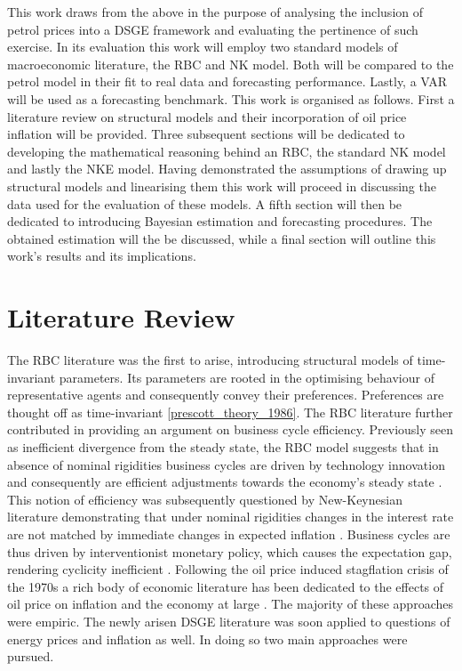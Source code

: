 \documentclass[12pt,a4paper,english]{article} %
\let\oldsection\section
\renewcommand\section{\clearpage\oldsection}
\begin{document}
	 This work draws from the above in the purpose of analysing the inclusion of petrol prices into a DSGE framework and evaluating the pertinence of such exercise. In its evaluation this work will employ two standard models of macroeconomic literature, the RBC and NK model. Both will be compared to the petrol model in their fit to real data and forecasting performance. Lastly, a \ac{VAR} will be used as a forecasting benchmark. This work is organised as follows. First a literature review on structural models and their incorporation of oil price inflation will be provided. Three subsequent sections will be dedicated to developing the mathematical reasoning behind an RBC, the standard NK model and lastly the \ac{NKE} model. Having demonstrated the assumptions of drawing up structural models and linearising them this work will proceed in discussing the data used for the evaluation of these models. A fifth section will then be dedicated to introducing Bayesian estimation and forecasting procedures. The obtained estimation will the be discussed, while a final section will outline this work's results and its implications.
	 
	\section{Literature Review}
	The RBC literature was the first to arise, introducing structural models of time-invariant parameters. Its parameters are rooted in the optimising behaviour of representative agents and consequently convey their preferences. Preferences are thought off as time-invariant \ref{prescott_theory_1986}. The RBC literature further contributed in providing an argument on business cycle efficiency. Previously seen as inefficient divergence from the steady state, the RBC model suggests that in absence of nominal rigidities business cycles are driven by technology innovation and consequently are efficient adjustments towards the economy's steady state \cite{christiano_current_1992}. This notion of efficiency was subsequently questioned by New-Keynesian literature demonstrating that under nominal rigidities changes in the interest rate are not matched by immediate changes in expected inflation \cite{gali_monetary_2008}. Business cycles are thus driven by interventionist monetary policy, which causes the expectation gap, rendering cyclicity inefficient \cite{gali_monetary_2008}. Following the oil price induced stagflation crisis of the 1970s a rich body of economic literature has been dedicated to the effects of oil price on inflation and the economy at large \cite{barsky_oil_2002, bernanke_systematic_1997}. The majority of these approaches were empiric. The newly arisen DSGE literature was soon applied to questions of energy prices and inflation as well. In doing so two main approaches were pursued.
	
\end{document}
